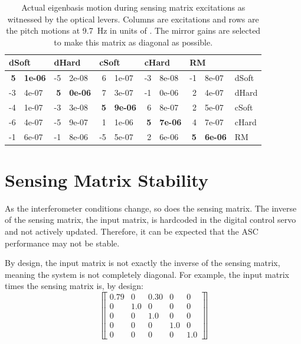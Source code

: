 \begin{table}
\centering
\caption[Actual eigenbasis motion during sensing matrix
excitations]{Actual eigenbasis motion during sensing matrix
  excitations as witnessed by the optical levers. Columns are
  excitations and rows are the pitch motions at 9.7~Hz in units of
  \microrad. The mirror gains are selected to make this matrix as
  diagonal as possible.} 
\begin{tabular}{r@{.}l r@{.}l r@{.}l r@{.}l r@{.}l l}
\hline
\multicolumn{2}{l}{dSoft} & \multicolumn{2}{l}{dHard}  & \multicolumn{2}{l}{cSoft} & \multicolumn{2}{l}{cHard} & \multicolumn{2}{l}{RM} & \\
\hline
   \textbf{5}&\textbf{1e-06} & -5&2e-08  & 6&1e-07 & -3&8e-08 &  -1&8e-07 & dSoft\\
  -3&4e-07 &  \textbf{5}&\textbf{0e-06}  &  7&3e-07 & -1&0e-06 &  2&4e-07 & dHard\\
  -4&1e-07 & -3&3e-08 &  \textbf{5}&\textbf{9e-06} &  6&8e-07 &  2&5e-07 & cSoft\\
  -6&4e-07 & -5&9e-07 &  1&1e-06 &  \textbf{5}&\textbf{7e-06} &  4&7e-07 & cHard\\
  -1&6e-07 & -1&8e-06 & -5&5e-07 &   2&6e-06 &  \textbf{5}&\textbf{6e-06} & RM\\
\hline
\end{tabular}
\label{table:excitations_calibrated}
\end{table}






\section{Sensing Matrix Stability}
As the interferometer conditions change, so does the sensing
matrix. The inverse of the sensing matrix, the input matrix, is
hardcoded in the digital control servo and not actively
updated. Therefore, it can be expected that the ASC performance may
not be stable. 

By design, the input matrix is not exactly the inverse of the sensing
matrix, meaning the system is not completely diagonal. For example,
the input matrix times the sensing matrix is, by design:
\begin{equation}
\left\llbracket \begin{array}{ccccc}
0.79 & 0 & 0.30 & 0 & 0 \\
0 & 1.0 & 0 & 0 & 0 \\
0 & 0 & 1.0 & 0 & 0 \\
0 & 0 & 0 & 1.0 & 0 \\
0 & 0 & 0 & 0 & 1.0 
\end{array} \right\rrbracket
\end{equation}

